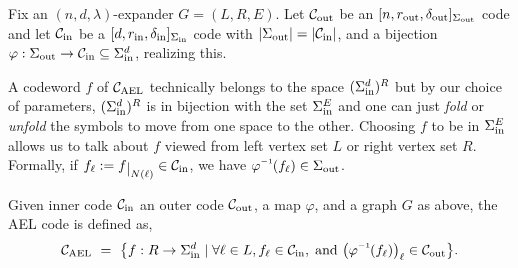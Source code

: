 


Fix an $(n,d,\lambda)$-expander $G = (L,R,E)$. Let ${\mathcal C}_{\mathrm{out}}$ be an $[n,r_{\mathrm{out}},\delta_{\mathrm{out}}]_{\Sigma_{\mathrm{out}}}$ code and let ${\mathcal C}_{\mathrm{in}}$ be a $[d,r_{\mathrm{in}},\delta_{\mathrm{in}}]_{\Sigma_{\mathrm{in}}}$ code with $\lvert\Sigma_{\mathrm{out}}\rvert = |{\mathcal C}_{\mathrm{in}}|$, and a bijection $\varphi: \Sigma_{\mathrm{out}}\rightarrow {\mathcal C}_{\mathrm{in}}\subseteq \Sigma_{\mathrm{in}}^d$,  realizing this.  

A codeword $f$ of ${ {\mathcal C}_{\mathrm{AEL}} }$ technically belongs to the space $(\Sigma_{\mathrm{in}}^d)^R$ but by our choice of parameters, $(\Sigma_{\mathrm{in}}^d)^R$ is in bijection with the set $\Sigma_{\mathrm{in}}^E$ and one can just \emph{fold} or \emph{unfold} the symbols to move from one space to the other. Choosing $f$ to be in $\Sigma_{\mathrm{in}}^E$ allows us to talk about $f$ viewed from left vertex set $L$ or right vertex set $R$. Formally, if $f_\ell \defeq f\restrict{N(\ell)} \in \cC_\inn$, we have $ \inv{\varphi}(f_\ell) \in \Sigma_\out$. 


%
% 
%
%
%


\begin{definition}

%
Given inner code ${\mathcal C}_{\mathrm{in}}$ an outer code ${\mathcal C}_{\mathrm{out}}$, a map $\varphi$, and a graph $G$ as above, the AEL code is defined as,
\[
\AELC ~=~ \braces[\big]{f: R\to\Sigma_\inn^d \mid \forall \ell \in L, f_\ell \in \cC_\inn,\;\text{and } \parens[\big]{\inv{\varphi}(f_\ell)}_\ell \in \cC_\out }.
\]
\end{definition}
%

